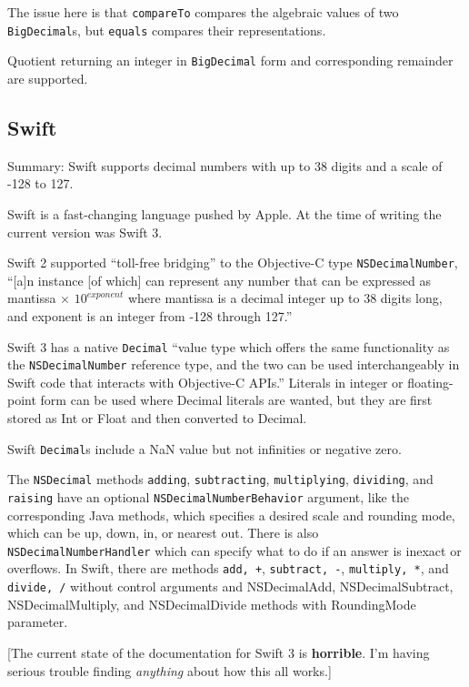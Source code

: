 \documentclass{article}
\begin{document}
The issue here is that {\tt compareTo} compares the algebraic
values of two {\tt BigDecimal}s, but {\tt equals} compares
their representations.

Quotient returning an integer in {\tt BigDecimal} form and
corresponding remainder are supported.

\subsection{Swift}

Summary: Swift supports decimal numbers with up to 38 digits
and a scale of -128 to 127.  

Swift is a fast-changing language pushed by Apple.
At the time of writing the current version was Swift 3.

Swift 2 supported ``toll-free bridging'' to the Objective-C
type {\tt NSDecimalNumber}, ``[a]n instance [of which]
can represent any number that can be expressed as
mantissa
$\times$
$10^{exponent}$
where mantissa
is a decimal integer up to 38 digits long, and exponent is an
integer from -128 through 127.''

Swift 3 has a native {\tt Decimal} ``value type which offers
the same functionality as the {\tt NSDecimalNumber} reference
type, and the two can be used interchangeably in Swift code
that interacts with Objective-C APIs.''  Literals in integer
or floating-point form can be used where Decimal literals
are wanted, but they are first stored as Int or Float and
then converted to Decimal.

Swift {\tt Decimal}s include a NaN value but not infinities
or negative zero.

The {\tt NSDecimal} methods {\tt adding}, {\tt subtracting}, {\tt multiplying},
{\tt dividing}, and {\tt raising} have an optional
{\tt NSDecimalNumberBehavior} argument, like the corresponding
Java methods, which specifies a desired scale and rounding
mode, which can be up, down, in, or nearest out.
There is also {\tt NSDecimalNumberHandler} which can specify
what to do if an answer is inexact or overflows.
In Swift, there are methods {\tt add, +}, {\tt subtract, -},
{\tt multiply, *}, and {\tt divide, /} without control arguments
and NSDecimalAdd, NSDecimalSubtract, NSDecimalMultiply,
and NSDecimalDivide methods with RoundingMode parameter.

[The current state of the documentation for Swift 3 is
{\bf horrible}.  I'm having serious trouble finding
{\it anything} about how this all works.]
\end{document}
